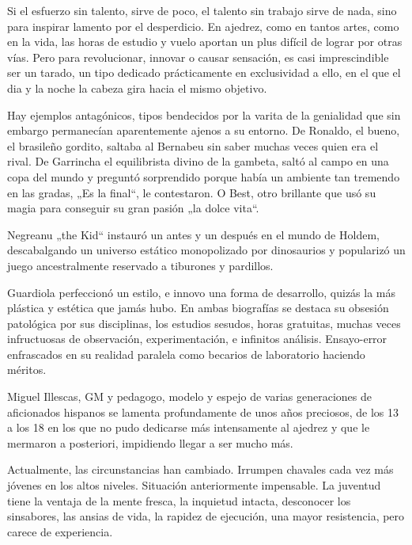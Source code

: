 

\cappar Si el esfuerzo sin talento, sirve de poco, el talento sin trabajo sirve de nada, sino para inspirar lamento por el desperdicio. En ajedrez, como en tantos artes, como en la vida, las horas de estudio y vuelo aportan un plus difícil de lograr por otras vías. Pero para revolucionar, innovar o causar sensación, es casi imprescindible ser un tarado, un tipo dedicado prácticamente en exclusividad a ello, en el que el dia y la noche la cabeza gira hacia el mismo objetivo.

Hay ejemplos antagónicos, tipos bendecidos por la varita de la genialidad que sin embargo permanecían aparentemente ajenos a su entorno. De Ronaldo, el bueno, el brasileño gordito, saltaba al Bernabeu sin saber muchas veces quien era el rival. De Garrincha el equilibrista divino de la gambeta, saltó al campo en una copa del mundo y preguntó sorprendido porque había un ambiente tan tremendo en las gradas, „Es la final“, le contestaron. O Best, otro brillante que usó su magia para conseguir su gran pasión „la dolce vita“.

Negreanu „the Kid“ instauró un antes y un después en el mundo de Holdem, descabalgando un universo estático monopolizado por dinosaurios y popularizó un juego ancestralmente reservado a tiburones y pardillos.  

Guardiola perfeccionó un estilo, e innovo una forma de desarrollo, quizás la más plástica y estética que jamás hubo. En ambas biografías se destaca su obsesión patológica por sus disciplinas, los estudios sesudos, horas gratuitas, muchas veces infructuosas de observación, experimentación, e infinitos análisis. Ensayo-error enfrascados en su realidad paralela como becarios de laboratorio haciendo méritos.

Miguel Illescas, GM y pedagogo, modelo y espejo de varias generaciones de aficionados hispanos se lamenta profundamente de unos años preciosos, de los 13 a los 18 en los que no pudo dedicarse más intensamente al ajedrez y que le mermaron a posteriori, impidiendo llegar a ser mucho más.

Actualmente, las circunstancias han cambiado. Irrumpen chavales cada vez más jóvenes en los altos niveles. Situación anteriormente impensable. La juventud tiene la ventaja de la mente fresca, la inquietud intacta, desconocer los sinsabores, las ansias de vida, la rapidez de ejecución, una mayor resistencia, pero carece de experiencia. 

